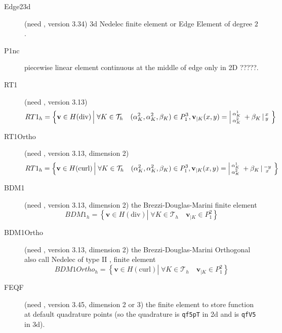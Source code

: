 \documentclass[a4paper,twoside,12pt]{book}
\begin{document}
\begin{description}
      \item[Edge23d]  (need , version 3.34) 3d Nedelec finite element or Edge  Element of degree $2$. 

      
     \item[P1nc]  piecewise linear   element continuous at
     the middle of edge only in 2D ?????.
    \item[RT1]  (need , version 3.13)
     \begin{equation}
         RT1_{h} = \left\{ \mathbf{v} \in H(\textrm{div}) \left|\; \forall K \in
         \mathcal{T}_{h} \quad  ( \alpha^2_{K}, \alpha^2_{K}, \beta_{K}) \in P_1^3,  \mathbf{v}_{|K}(x,y) = 
         \left|\begin{smallmatrix} \alpha^1_{K} \\ \alpha^2_{K} \end{smallmatrix}\right. + \beta_{K}\left|\begin{smallmatrix} x \\ y \end{smallmatrix}\right.   \right.\right\}
         \label{eq:RT1}
     \end{equation}
    
    \item[RT1Ortho]  (need , version 3.13, dimension 2)
         \begin{equation}
         RT1_{h} = \left\{ \mathbf{v} \in H(\textrm{curl}) \left|\; \forall K \in
         \mathcal{T}_{h} \quad  ( \alpha^2_{K}, \alpha^2_{K}, \beta_{K}) \in P_1^3,  \mathbf{v}_{|K}(x,y) = 
         \left|\begin{smallmatrix} \alpha^1_{K} \\ \alpha^2_{K} \end{smallmatrix}\right. + \beta_{K}\left|\begin{smallmatrix} -y \\ x \end{smallmatrix}\right.   \right.\right\}
         \label{eq:RT1Ortho}
     \end{equation}

    \item[BDM1]  (need , version 3.13, dimension 2) the Brezzi-Douglas-Marini finite element 
     \begin{equation}
         BDM1_{h} = \left\{ \mathbf{v} \in H(\textrm{div}) \left|\; \forall K \in
         \mathcal{T}_{h} \quad   \mathbf{v}_{|K} \in P_1^2
         \right.\right\}
         \label{eq:BDM1}
     \end{equation}
        
    \item[BDM1Ortho]  (need , version 3.13, dimension 2) the Brezzi-Douglas-Marini Orthogonal also call
    Nedelec of type II , finite element 
       \begin{equation}
         BDM1Ortho_{h} = \left\{ \mathbf{v} \in H(\textrm{curl}) \left|\; \forall K \in
         \mathcal{T}_{h} \quad   \mathbf{v}_{|K} \in P_1^2
         \right.\right\}
         \label{eq:BDM1Ortho}
     \end{equation}
   \item[FEQF]   (need , version 3.45, dimension 2 or 3) the finite element to store 
   function at default quadrature points (so the  quadrature is \texttt{qf5pT} in 2d and is   \texttt{qfV5} in 3d).
   

\end{description}
\end{document}

